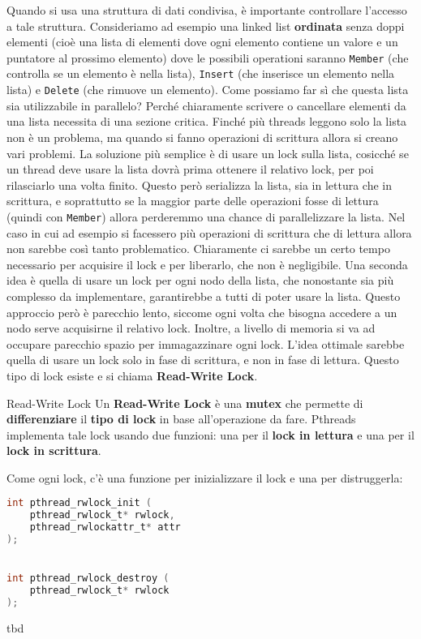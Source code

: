 Quando si usa una struttura di dati condivisa, è importante controllare l'accesso a tale struttura. Consideriamo ad esempio una linked list \textbf{ordinata} senza doppi elementi (cioè una lista di elementi dove ogni elemento contiene un valore e un puntatore al prossimo elemento) dove le possibili operationi saranno \verb|Member| (che controlla se un elemento è nella lista), \verb|Insert| (che inserisce un elemento nella lista) e \verb|Delete| (che rimuove un elemento).
\nwl
Come possiamo far sì che questa lista sia utilizzabile in parallelo? Perché chiaramente scrivere o cancellare elementi da una lista necessita di una sezione critica. Finché più threads leggono solo la lista non è un problema, ma quando si fanno operazioni di scrittura allora si creano vari problemi.
\nwl
La soluzione più semplice è di usare un lock sulla lista, cosicché se un thread deve usare la lista dovrà prima ottenere il relativo lock, per poi rilasciarlo una volta finito. Questo però serializza la lista, sia in lettura che in scrittura, e soprattutto se la maggior parte delle operazioni fosse di lettura (quindi con \verb|Member|) allora perderemmo una chance di parallelizzare la lista. Nel caso in cui ad esempio si facessero più operazioni di scrittura che di lettura allora non sarebbe così tanto problematico. Chiaramente ci sarebbe un certo tempo necessario per acquisire il lock e per liberarlo, che non è negligibile.
\nwl
Una seconda idea è quella di usare un lock per ogni nodo della lista, che nonostante sia più complesso da implementare, garantirebbe a tutti di poter usare la lista. Questo approccio però è parecchio lento, siccome ogni volta che bisogna accedere a un nodo serve acquisirne il relativo lock. Inoltre, a livello di memoria si va ad occupare parecchio spazio per immagazzinare ogni lock.
\nwl
L'idea ottimale sarebbe quella di usare un lock solo in fase di scrittura, e non in fase di lettura. Questo tipo di lock esiste e si chiama \textbf{Read-Write Lock}.

\begin{definition}{Read-Write Lock}
    Un \textbf{Read-Write Lock} è una \textbf{mutex} che permette di \textbf{differenziare} il \textbf{tipo di lock} in base all'operazione da fare. Pthreads implementa tale lock usando due funzioni: una per il \textbf{lock in lettura} e una per il \textbf{lock in scrittura}.
\end{definition}

Come ogni lock, c'è una funzione per inizializzare il lock e una per distruggerla:

\begin{codedefine}
    \begin{lstlisting}[language = C, numbers = none]
int pthread_rwlock_init (
    pthread_rwlock_t* rwlock,
    pthread_rwlockattr_t* attr
);


int pthread_rwlock_destroy (
    pthread_rwlock_t* rwlock
);\end{lstlisting}
\tcblower
tbd
\end{codedefine}


